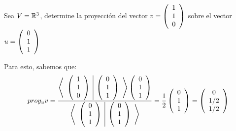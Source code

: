 \begin{ejemplo}
    Sea $V = \rtres$, determine la proyección del vector $v = \vectrtres{1}{1}{0}$ sobre el vector $u = \vectrtres{0}{1}{1}$ 
\end{ejemplo}
\begin{sol}
Para esto, sabemos que:
$$proy_u v = \frac{\prodInt{\vectrtres{1}{1}{0}}{\vectrtres{0}{1}{1}}\vectrtres{0}{1}{1}}{\prodInt{\vectrtres{0}{1}{1}}{\vectrtres{0}{1}{1}}} = \frac{1}{2}\vectrtres{0}{1}{1} = \vectrtrescent{0}{1/2}{1/2}$$
\end{sol}